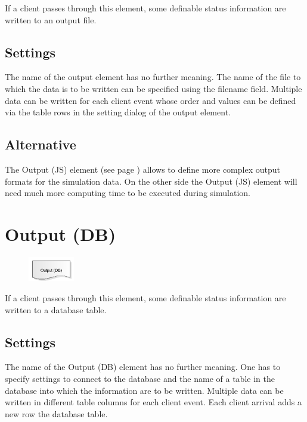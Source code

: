 If a client passes through this element, some definable status information are written to an output file.

\subsection*{Settings}

The name of the output element has no further meaning. The name of the file to which the data is to be written
can be specified using the filename field. Multiple data can be written for each client event whose order and
values can be defined via the table rows in the setting dialog of the output element.

\subsection*{Alternative}

The Output (JS) element (see page \pageref{ref:ModelElementOutputJS}) allows to define more complex output formats
for the simulation data. On the other side the Output (JS) element will need much more computing time to be
executed during simulation.


\section{Output (DB)}
\label{ref:ModelElementOutputDB}

\begin{figure}
\vspace{-22pt}
\includegraphics[width=2cm]{imageModelElementOutputDB.png}
\vspace{-22pt}
\end{figure}

If a client passes through this element, some definable status information are written to a database table.

\subsection*{Settings}

The name of the Output (DB) element has no further meaning. One has to specify settings to connect to
the database and the name of a table in the database into which the information are to be written.  
Multiple data can be written in different table columns for each client event. Each client arrival
adds a new row the database table.



